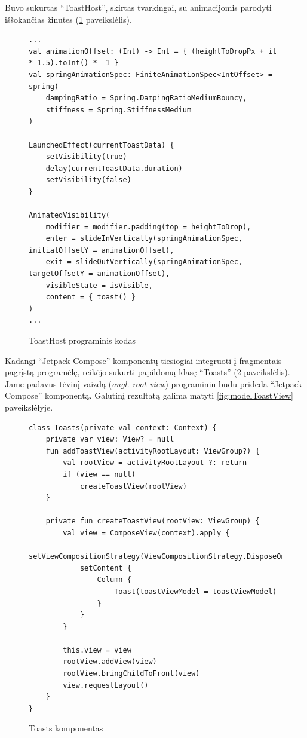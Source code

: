 \newpage
Buvo sukurtas \enquote{ToastHost}, skirtas tvarkingai, su animacijomis parodyti iššokančias žinutes  (\ref{fig:ToastHost} paveikslėlis).

\begin{figure}[htbp!]
    \centering
    \begin{verbatim}
...
val animationOffset: (Int) -> Int = { (heightToDropPx + it * 1.5).toInt() * -1 }
val springAnimationSpec: FiniteAnimationSpec<IntOffset> = spring(
    dampingRatio = Spring.DampingRatioMediumBouncy,
    stiffness = Spring.StiffnessMedium
)

LaunchedEffect(currentToastData) {
    setVisibility(true)
    delay(currentToastData.duration)
    setVisibility(false)
}

AnimatedVisibility(
    modifier = modifier.padding(top = heightToDrop),
    enter = slideInVertically(springAnimationSpec, initialOffsetY = animationOffset),
    exit = slideOutVertically(springAnimationSpec, targetOffsetY = animationOffset),
    visibleState = isVisible,
    content = { toast() }
)
...
    \end{verbatim}
    \caption{ToastHost programinis kodas}
    \label{fig:ToastHost}
\end{figure}

\newpage
Kadangi \enquote{Jetpack Compose} komponentų tiesiogiai integruoti į fragmentais pagrįstą programėlę, reikėjo sukurti papildomą klasę \enquote{Toasts} (\ref{fig:Toasts} paveikslėlis). Jame padavus tėvinį vaizdą (\emph{angl. root view}) programiniu būdu prideda \enquote{Jetpack Compose} komponentą. Galutinį rezultatą galima matyti \ref{fig:modelToastView} paveikslėlyje.

\begin{figure}[htbp!]
    \centering
    \begin{verbatim}
class Toasts(private val context: Context) {
    private var view: View? = null
    fun addToastView(activityRootLayout: ViewGroup?) {
        val rootView = activityRootLayout ?: return
        if (view == null)
            createToastView(rootView)
    }

    private fun createToastView(rootView: ViewGroup) {
        val view = ComposeView(context).apply {
        setViewCompositionStrategy(ViewCompositionStrategy.DisposeOnViewTreeLifecycleDestroyed)
            setContent {
                Column {
                    Toast(toastViewModel = toastViewModel)
                }
            }
        }

        this.view = view
        rootView.addView(view)
        rootView.bringChildToFront(view)
        view.requestLayout()
    }
}
\end{verbatim}
    \caption{Toasts komponentas}
    \label{fig:Toasts}
\end{figure}